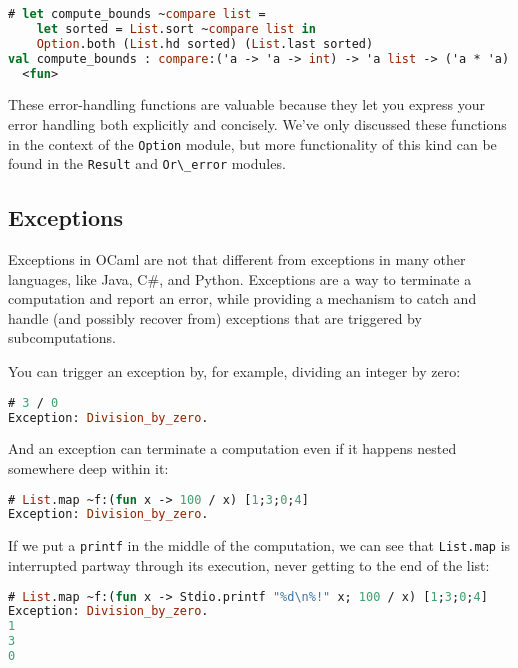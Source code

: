 \begin{lstlisting}[language=Caml]
# let compute_bounds ~compare list =
    let sorted = List.sort ~compare list in
    Option.both (List.hd sorted) (List.last sorted)
val compute_bounds : compare:('a -> 'a -> int) -> 'a list -> ('a * 'a) option =
  <fun>
\end{lstlisting}

These error-handling functions are valuable because they let you express
your error handling both explicitly and concisely. We've only discussed
these functions in the context of the \passthrough{\lstinline!Option!}
module, but more functionality of this kind can be found in the
\passthrough{\lstinline!Result!} and \passthrough{\lstinline!Or\_error!}
modules.~~

\hypertarget{exceptions}{%
\subsection{Exceptions}\label{exceptions}}

Exceptions in OCaml are not that different from exceptions in many other
languages, like Java, C\#, and Python. Exceptions are a way to terminate
a computation and report an error, while providing a mechanism to catch
and handle (and possibly recover from) exceptions that are triggered by
subcomputations.

You can trigger an exception by, for example, dividing an integer by
zero:

\begin{lstlisting}[language=Caml]
# 3 / 0
Exception: Division_by_zero.
\end{lstlisting}

And an exception can terminate a computation even if it happens nested
somewhere deep within it:

\begin{lstlisting}[language=Caml]
# List.map ~f:(fun x -> 100 / x) [1;3;0;4]
Exception: Division_by_zero.
\end{lstlisting}

If we put a \passthrough{\lstinline!printf!} in the middle of the
computation, we can see that \passthrough{\lstinline!List.map!} is
interrupted partway through its execution, never getting to the end of
the list:

\begin{lstlisting}[language=Caml]
# List.map ~f:(fun x -> Stdio.printf "%d\n%!" x; 100 / x) [1;3;0;4]
Exception: Division_by_zero.
1
3
0
\end{lstlisting}

